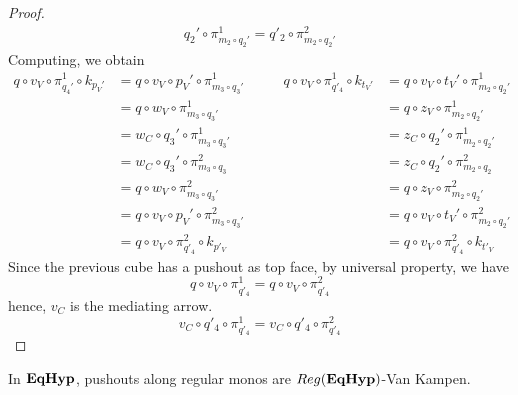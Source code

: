 \begin{proof}
\[\begin{split}
		q_2' \circ \pi_{m_2 \circ q_2'}^1 = q'_2 \circ \pi_{m_2 \circ q_2'}^2
	\end{split}\]
	Computing, we obtain
	\[\begin{split}
		q \circ v_V \circ \pi_{q_4'}^1 \circ k_{p_V'} &= q \circ v_V \circ p_V' \circ \pi_{m_3 \circ q_3'}^1 \\
							      &= q \circ w_V \circ \pi_{m_3 \circ q_3'}^1 \\
							      &= w_C \circ q_3' \circ \pi_{m_3 \circ q_3'}^1 \\
							      &= w_C \circ q_3' \circ \pi_{m_3 \circ q_3}^2 \\
							      &= q \circ w_V \circ \pi_{m_3 \circ q_3'}^2 \\
							      &= q \circ v_V \circ p_V' \circ \pi_{m_3 \circ q_3'}^2 \\
							      &= q \circ v_V \circ \pi_{q'_4}^2 \circ k_{p'_V}
	\end{split}\qquad\begin{split}
		q \circ v_V \circ \pi_{q'_4}^1 \circ k_{t_V'} &= q \circ v_V \circ t_V' \circ \pi_{m_2 \circ q_2'}^1 \\
							      &= q \circ z_V \circ \pi_{m_2 \circ q_2'}^1 \\
							      &= z_C \circ q_2' \circ \pi_{m_2 \circ q_2'}^1 \\
							      &= z_C \circ q_2' \circ \pi_{m_2 \circ q_2}^2 \\
							      &= q \circ z_V \circ \pi_{m_2 \circ q_2'}^2 \\
							      &= q \circ v_V \circ t_V' \circ \pi_{m_2 \circ q_2'}^2 \\
							      &= q \circ v_V \circ \pi_{q'_4}^2 \circ k_{t'_V}
	\end{split}\]
	Since the previous cube has a pushout as top face, by universal property, we have
	\[
		q \circ v_V \circ \pi_{q'_4}^1 = q \circ v_V \circ \pi_{q'_4}^2
	\]
	hence, $v_C$ is the mediating arrow.
	\[
		v_C \circ q'_4 \circ \pi_{q'_4}^1 = v_C \circ q'_4 \circ \pi_{q'_4}^2
	\]
\end{proof}

\begin{lemma}\label{lemma:van_kampen}
	In $\textbf{\textup{EqHyp}}$, pushouts along regular monos are $\reg(\EqHyp)$-Van Kampen.
\end{lemma}

